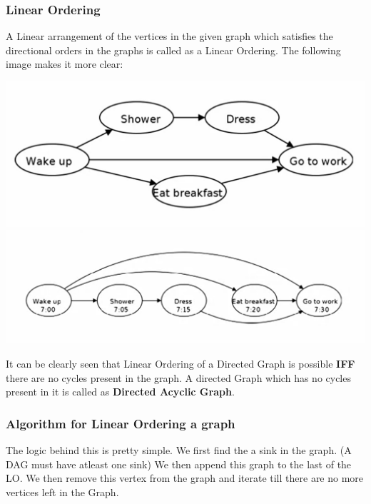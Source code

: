 \documentclass{article}
\theoremstyle{definition}
\theoremstyle{example}
\begin{document}
\subsubsection{\Large Linear Ordering}
\hspace{4mm} A Linear arrangement of the vertices in the given graph which satisfies the directional orders in the graphs is called as a Linear Ordering. The following image makes it more clear:
\vspace{4mm}
\begin{center}
    \includegraphics[scale = 0.56]{lo1.png}
    \newline
    \includegraphics[scale = 0.7]{lo2.png}
\end{center}
\vspace{4mm}
 It can be clearly seen that Linear Ordering of a Directed Graph is possible \textbf{IFF} there are no cycles present in the graph. A directed Graph which has no cycles present in it is called as \textbf{Directed Acyclic Graph}.\par
 
 \subsubsection*{\Large Algorithm for Linear Ordering a graph}
\hspace{4mm} 
The logic behind this is pretty simple. We first find the a sink in the graph. (A DAG must have atleast one sink) We then append this graph to the last of the LO. We then remove this vertex from the graph and iterate till there are no more vertices left in the Graph.
\end{document}

